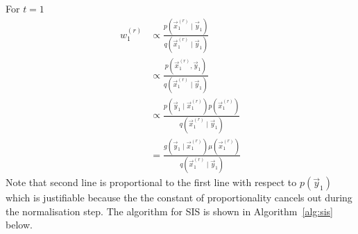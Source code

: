     For $t = 1$
    \begin{align}
        w_1^{(r)}   &\propto \frac{p\left(\vec x_1^{(r)} \mid \vec y_1\right)}{q\left(\vec x_1^{(r)} \mid \vec y_1\right)} \\
                    &\propto \frac{p\left(\vec x_1^{(r)}, \vec y_1\right)}{q\left(\vec x_1^{(r)} \mid \vec y_1\right)} \\
                    &\propto \frac{p\left(\vec y_1 \mid \vec x^{(r)}_1\right) p\left(\vec x^{(r)}_1\right)}{q\left(\vec x_1^{(r)} \mid \vec y_1\right)} \\
                    &= \frac{g\left(\vec y_1 \mid \vec x^{(r)}_1\right) \mu\left(\vec x^{(r)}_1\right)}{q\left(\vec x_1^{(r)} \mid \vec y_1\right)} 
    \end{align}
    Note that second line is proportional to the first line with respect to $p(\vec y_1)$ which is justifiable because the the constant of proportionality cancels out during the normalisation step. The algorithm for SIS is shown in Algorithm~\ref{alg:sis} below.

